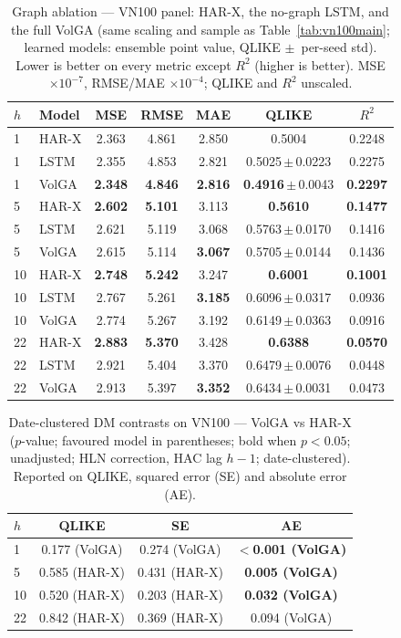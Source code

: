 \documentclass[runningheads]{llncs}
\begin{document}
\begin{table}[t]
\centering
\caption{Graph ablation --- VN100 panel: HAR-X, the no-graph LSTM, and the full VolGA (same scaling
and sample as Table~\ref{tab:vn100main}; learned models: ensemble point value, QLIKE $\pm$~per-seed
std). Lower is better on every metric except $R^2$ (higher is better). MSE $\times10^{-7}$, RMSE/MAE
$\times10^{-4}$; QLIKE and $R^2$ unscaled.}
\label{tab:vn100graph}
\footnotesize
\setlength{\tabcolsep}{6pt}
\begin{tabular}{llccccc}
\toprule
$h$ & Model & MSE & RMSE & MAE & QLIKE & $R^2$ \\
\midrule
1 & HAR-X & 2.363 & 4.861 & 2.850 & 0.5004 & 0.2248 \\
1 & LSTM  & 2.355 & 4.853 & 2.821 & 0.5025\,$\pm$\,0.0223 & 0.2275 \\
1 & VolGA & \textbf{2.348} & \textbf{4.846} & \textbf{2.816} & \textbf{0.4916}\,$\pm$\,0.0043 & \textbf{0.2297} \\
\midrule
5 & HAR-X & \textbf{2.602} & \textbf{5.101} & 3.113 & \textbf{0.5610} & \textbf{0.1477} \\
5 & LSTM  & 2.621 & 5.119 & 3.068 & 0.5763\,$\pm$\,0.0170 & 0.1416 \\
5 & VolGA & 2.615 & 5.114 & \textbf{3.067} & 0.5705\,$\pm$\,0.0144 & 0.1436 \\
\midrule
10 & HAR-X & \textbf{2.748} & \textbf{5.242} & 3.247 & \textbf{0.6001} & \textbf{0.1001} \\
10 & LSTM  & 2.767 & 5.261 & \textbf{3.185} & 0.6096\,$\pm$\,0.0317 & 0.0936 \\
10 & VolGA & 2.774 & 5.267 & 3.192 & 0.6149\,$\pm$\,0.0363 & 0.0916 \\
\midrule
22 & HAR-X & \textbf{2.883} & \textbf{5.370} & 3.428 & \textbf{0.6388} & \textbf{0.0570} \\
22 & LSTM  & 2.921 & 5.404 & 3.370 & 0.6479\,$\pm$\,0.0076 & 0.0448 \\
22 & VolGA & 2.913 & 5.397 & \textbf{3.352} & 0.6434\,$\pm$\,0.0031 & 0.0473 \\
\bottomrule
\end{tabular}
\end{table}

\begin{table}[t]
\centering
\caption{Date-clustered DM contrasts on VN100 --- VolGA vs HAR-X ($p$-value; favoured model in
parentheses; bold when $p<0.05$; unadjusted; HLN correction, HAC lag $h{-}1$; date-clustered).
Reported on QLIKE, squared error (SE) and absolute error (AE).}
\label{tab:dm-vn100-harx}
\footnotesize
\setlength{\tabcolsep}{8pt}
\begin{tabular}{lccc}
\toprule
$h$ & QLIKE & SE & AE \\
\midrule
1  & 0.177 (VolGA) & 0.274 (VolGA) & \textbf{$<$0.001 (VolGA)} \\
5  & 0.585 (HAR-X) & 0.431 (HAR-X) & \textbf{0.005 (VolGA)} \\
10 & 0.520 (HAR-X) & 0.203 (HAR-X) & \textbf{0.032 (VolGA)} \\
22 & 0.842 (HAR-X) & 0.369 (HAR-X) & 0.094 (VolGA) \\
\bottomrule
\end{tabular}
\end{table}
\end{document}
